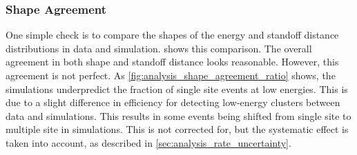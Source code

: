 \documentclass[herrin-thesis.tex]{subfiles}
\begin{document}
\subsubsection{Shape Agreement}
\label{sec:analysis_shape_agreement}
One simple check is to compare the shapes of the energy and standoff distance distributions in data and simulation.  shows this comparison. The overall agreement in both shape and standoff distance looks reasonable. However, this agreement is not perfect. As \cref{fig:analysis_shape_agreement_ratio} shows, the simulations underpredict the fraction of single site events at low energies. This is due to a slight difference in efficiency for detecting low-energy clusters between data and simulations. This results in some events being shifted from single site to multiple site in simulations. This is not corrected for, but the systematic effect is taken into account, as described in \cref{sec:analysis_rate_uncertainty}.
\end{document}
